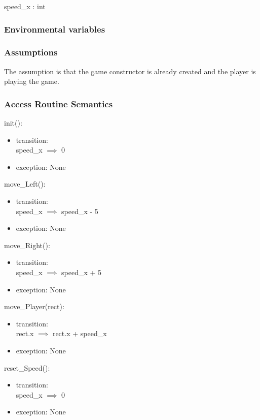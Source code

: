 \documentclass[12pt, titlepage]{article}
\begin{document}
speed\_x : int\\

\subsubsection {Environmental variables}

\subsubsection {Assumptions}
The assumption is that the game constructor is already created and the player is playing the game.

\subsubsection {Access Routine Semantics}

\noindent init(): 
\begin{itemize}
\item transition:\\
speed\_x $\implies$ 0\\
\item exception: None
\end{itemize}

\noindent move\_Left():
\begin{itemize}
\item transition:\\
speed\_x $\implies$ speed\_x - 5\\
\item exception: None
\end{itemize}

\noindent move\_Right():
\begin{itemize}
\item transition:\\
speed\_x $\implies$ speed\_x + 5\\
\item exception: None
\end{itemize}

\noindent move\_Player(rect):
\begin{itemize}
\item transition:\\
rect.x $\implies$ rect.x + speed\_x\\
\item exception: None
\end{itemize}

\noindent reset\_Speed():
\begin{itemize}
\item transition:\\
speed\_x $\implies$ 0\\
\item exception: None
\end{itemize}
\end{document}
